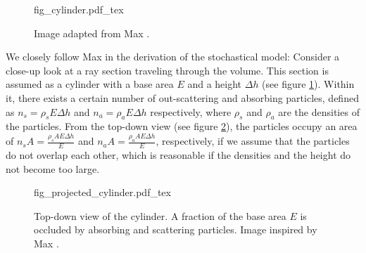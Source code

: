 \begin{figure}
\centering
\def\svgwidth{\columnwidth}
{fig_cylinder.pdf_tex}

\caption{Image adapted from Max \cite{468400}.}
\label{fig:cylinder}
\end{figure}
We closely follow Max\cite{468400} in the derivation of the stochastical model: Consider a close-up look at a ray section traveling through the volume. This section is assumed as a cylinder with a base area $E$ and a height $\Delta h$ (see figure \ref{fig:cylinder}). Within it, there exists a certain number of out-scattering and absorbing particles, defined as $n_s={\rho}_sE{\Delta}h$ and $n_a={\rho}_aE{\Delta}h$ respectively, where ${\rho}_s$ and ${\rho}_a$ are the densities of the particles. From the top-down view (see figure \ref{fig:projected_cylinder}), the particles occupy an area of ${n_sA}=\frac{{\rho}_sAE{\Delta}h}{E}$ and ${n_aA}=\frac{{\rho}_aAE{\Delta}h}{E}$, respectively, if we assume that the particles do not overlap each other, which is reasonable if the densities and the height do not become too large.



\begin{figure}
\centering
\def\svgwidth{\columnwidth}
{fig_projected_cylinder.pdf_tex}

\caption{Top-down view of the cylinder. A fraction of the base area $E$ is occluded by absorbing and scattering particles. Image inspired by Max \cite{468400}.}
\label{fig:projected_cylinder}
\end{figure}

